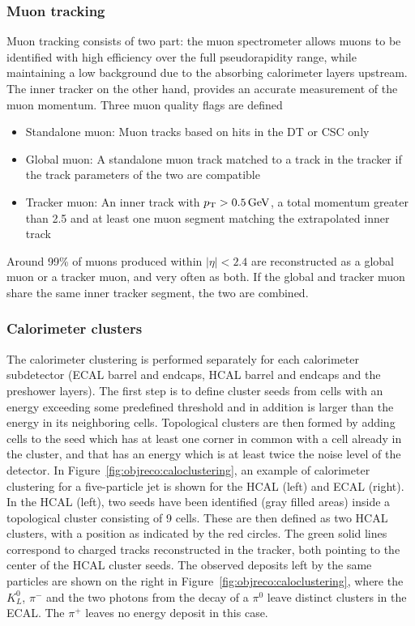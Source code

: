 \subsubsection{Muon tracking}
\label{subsub:objreco:muontracking}
Muon tracking consists of two part: the muon spectrometer allows muons to be identified with high efficiency over the full pseudorapidity range, while maintaining a low background due to the absorbing calorimeter layers upstream. The inner tracker on the other hand, provides an accurate measurement of the muon momentum. Three muon quality flags are defined
\begin{itemize}
  \itemsep0em 
  \item Standalone muon: Muon tracks based on hits in the DT or CSC only
  \item Global muon: A standalone muon track matched to a track in the tracker if the track parameters of the two are compatible
  \item Tracker muon: An inner track with $p_{\mathrm{T}}> 0.5 \,\text{Ge\hspace{-.08em}V}$, a total momentum greater than 2.5 \GeV and at least one muon segment matching the extrapolated inner track
\end{itemize}
Around 99\% of muons produced within $|\eta|<2.4$ are reconstructed as a global muon or a tracker muon, and very often as both. If the global and tracker muon share the same inner tracker segment, the two are combined.

\subsubsection{Calorimeter clusters}
 The calorimeter clustering is performed separately for each calorimeter subdetector (ECAL barrel and endcaps, HCAL barrel and endcaps and the preshower layers).
The first step is to define cluster seeds from cells with an energy exceeding some predefined threshold and in addition is larger than the energy in its neighboring cells. Topological clusters are then formed by adding cells to the seed which has at least one corner in common with a cell already in the cluster, and that has an energy which is at least twice the noise level of the detector. In Figure~\ref{fig:objreco:caloclustering}, an example of calorimeter clustering for a five-particle jet is shown for the HCAL (left) and ECAL (right). In the HCAL (left), two seeds have been identified (gray filled areas) inside a topological cluster consisting of 9 cells. These are then defined as two HCAL clusters, with a position as indicated by the red circles. The green solid lines correspond to charged tracks reconstructed in the tracker, both pointing to the center of the HCAL cluster seeds. The observed deposits left by the same particles are shown on the right in Figure~\ref{fig:objreco:caloclustering}, where the $K^0_L$, $\pi^-$ and the two photons from the decay of a $\pi^0$ leave distinct clusters in the ECAL. The $\pi^+$ leaves no energy deposit in this case. 

